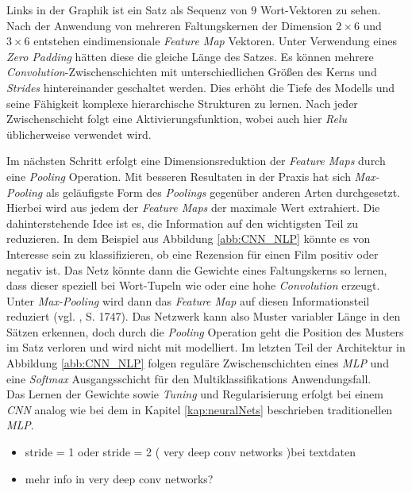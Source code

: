 \documentclass[a4paper,11pt]{article}
\begin{document}
Links in der Graphik ist ein Satz als Sequenz von $9$ Wort-Vektoren zu sehen. Nach der Anwendung von mehreren Faltungskernen der Dimension $2 \times 6$ und $3 \times 6$ entstehen eindimensionale \textit{Feature Map} Vektoren. Unter Verwendung eines \textit{Zero Padding} hätten diese die gleiche Länge des Satzes. Es können mehrere \textit{Convolution}-Zwischenschichten mit unterschiedlichen Größen des Kerns und \textit{Strides} hintereinander geschaltet werden. Dies erhöht die Tiefe des Modells und seine Fähigkeit komplexe hierarchische Strukturen zu lernen. Nach jeder Zwischenschicht folgt eine Aktivierungsfunktion, wobei auch hier \textit{Relu} üblicherweise verwendet wird.

Im nächsten Schritt erfolgt eine Dimensionsreduktion der \textit{Feature Maps} durch eine \textit{Pooling} Operation. Mit besseren Resultaten in der Praxis hat sich \textit{Max-Pooling} als geläufigste Form des \textit{Poolings} gegenüber anderen Arten durchgesetzt. Hierbei wird aus jedem der \textit{Feature Maps} der maximale Wert extrahiert. Die dahinterstehende Idee ist es, die Information auf den wichtigsten Teil zu reduzieren. In dem Beispiel aus Abbildung \ref{abb:CNN_NLP} könnte es von Interesse sein zu klassifizieren, ob eine Rezension für einen Film positiv oder negativ ist. Das Netz könnte dann die Gewichte eines Faltungskerns so lernen, dass dieser speziell bei Wort-Tupeln wie  oder  eine hohe \textit{Convolution} erzeugt. Unter \textit{Max-Pooling} wird dann das \textit{Feature Map} auf diesen Informationsteil reduziert (vgl. \cite{cnnSentence}, S. 1747). Das Netzwerk kann also Muster variabler Länge in den Sätzen erkennen, doch durch die \textit{Pooling} Operation geht die Position des Musters im Satz verloren und wird nicht mit modelliert.
Im letzten Teil der Architektur in Abbildung \ref{abb:CNN_NLP} folgen reguläre Zwischenschichten eines \textit{MLP} und eine \textit{Softmax} Ausgangsschicht für den Multiklassifikations Anwendungsfall.\\
Das Lernen der Gewichte sowie \textit{Tuning} und Regularisierung erfolgt bei einem \textit{CNN} analog wie bei dem in Kapitel \ref{kap:neuralNets} beschrieben traditionellen \textit{MLP}.


\begin{itemize}
    \item stride = 1 oder stride = 2 ( very deep conv networks )bei textdaten
    \item mehr info in very deep conv networks?
\end{itemize}{}
\end{document}
